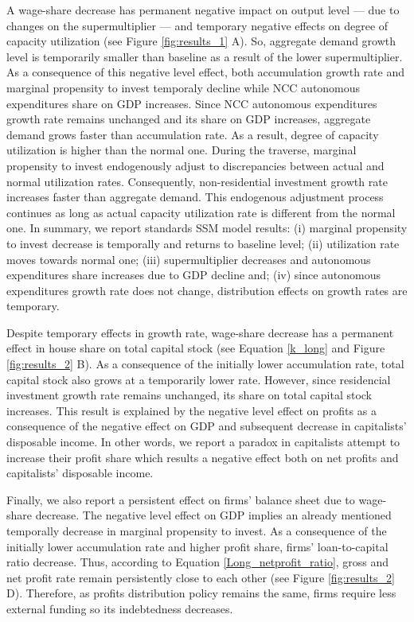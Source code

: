\documentclass[11pt]{article}
\begin{document}
A wage-share decrease has permanent negative impact on output level --- due to changes on the supermultiplier --- and temporary negative effects on degree of capacity utilization (see Figure \ref{fig:results_1} A).
So, aggregate demand growth level is temporarily smaller than baseline as a result of the lower supermultiplier.
As a consequence of this negative level effect, both accumulation growth rate and marginal propensity to invest temporaly decline while NCC autonomous expenditures share on GDP increases.
Since NCC autonomous expenditures growth rate remains unchanged and its share on GDP increases, aggregate demand grows faster than accumulation rate.
As a result, degree of capacity utilization is higher than the normal one.
During the traverse, marginal propensity to invest endogenously adjust to discrepancies between actual and normal utilization rates.
Consequently, non-residential investment growth rate increases faster than aggregate demand.
This endogenous adjustment process continues as long as actual capacity utilization rate is different from the normal one.
In summary, we report standards SSM model results:
    (i) marginal propensity to invest decrease is temporally and returns to baseline level;
    (ii) utilization rate moves towards normal one;
    (iii) supermultiplier decreases and autonomous expenditures share increases due to GDP decline and; 
    (iv) since autonomous expenditures growth rate does not change, distribution effects on growth rates are temporary. 


Despite temporary effects in growth rate, wage-share decrease has a permanent effect in house share on total capital stock (see Equation \ref{k_long} and Figure \ref{fig:results_2} B).
As a consequence of the initially lower accumulation rate, total capital stock also grows at a temporarily lower rate.
However, since residencial investment growth rate remains unchanged, its share on total capital stock increases.
This result is explained by the negative level effect on profits as a consequence of the negative effect on GDP and subsequent decrease in capitalists' disposable income.
In other words, we report a paradox in capitalists attempt to increase their profit share which results a negative effect both on net profits and capitalists' disposable income.

Finally, we also report a persistent effect on firms' balance sheet due to wage-share decrease.
The negative level effect on GDP implies an already mentioned temporally decrease in marginal propensity to invest.
As a consequence of the initially lower accumulation rate and higher profit share, firms' loan-to-capital ratio decrease.
Thus, according to Equation \ref{Long_netprofit_ratio}, gross and net profit rate remain persistently close to each other (see Figure \ref{fig:results_2} D).
Therefore, as profits distribution policy remains the same, firms require less external funding so its indebtedness decreases.
\end{document}
